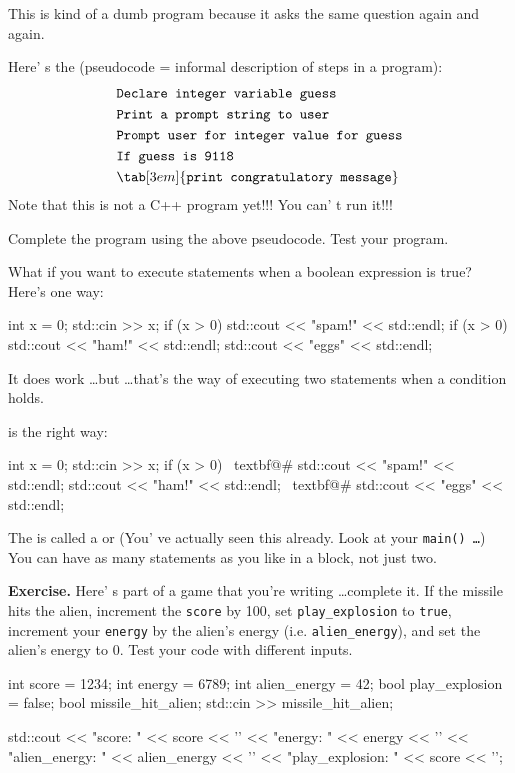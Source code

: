 This is kind of a dumb program because it asks the same question again
and again.

Here' s the  (pseudocode = informal
description of steps in a program):
\begin{align*}
& \texttt{Declare integer variable guess}\\
& \texttt{Print a prompt string to user}\\
& \texttt{Prompt user for integer value for guess}\\
& \texttt{If guess is 9118}\\
& \tab[3em]{\texttt{print congratulatory message}}\\
\end{align*}
Note that this is not a C++ program yet!!! You can' t run
it!!!

Complete the program using the above pseudocode. Test your program.

\newpage{}

What if you want to execute  statements when a
boolean expression is true? Here's one way:\\
\begin{console}[commandchars=\~\@\#]
int x = 0;
std::cin >> x;
if (x > 0)
   std::cout << "spam!" << std::endl;
if (x > 0)
   std::cout << "ham!" << std::endl;
std::cout << "eggs" << std::endl;
\end{console}

It does work \dots but \dots that's the 
way of executing two statements when a condition holds.

 is the right way:
\begin{console}[commandchars=\~\@\#]
int x = 0;
std::cin >> x;
if (x > 0)
~textbf@{#
        std::cout << "spam!" << std::endl;
        std::cout << "ham!" << std::endl;
~textbf@}#
std::cout << "eggs" << std::endl;
\end{console}

The  is called a  or (You' ve actually seen this already. Look at
your \texttt{main() \dots}) You can have as many statements as you like
in a block, not just two.

\textbf{Exercise.} Here' s part of a game that
you're writing \dots complete it. If the missile hits the alien, increment the \verb!score! by 100, set \verb!play_explosion! to \verb`true`, increment your \verb!energy! by the alien's energy (i.e. \verb`alien_energy`), and set the alien's energy to 0. Test your code with different inputs.
\begin{console}
int score = 1234;
int energy = 6789;
int alien_energy = 42;
bool play_explosion = false;
bool missile_hit_alien;
std::cin >> missile_hit_alien;


std::cout << "score: " << score << '\n'
          << "energy: " << energy << '\n'
          << "alien_energy: " << alien_energy << '\n'
          << "play_explosion: " << score << '\n';
\end{console}
\newpage{}

